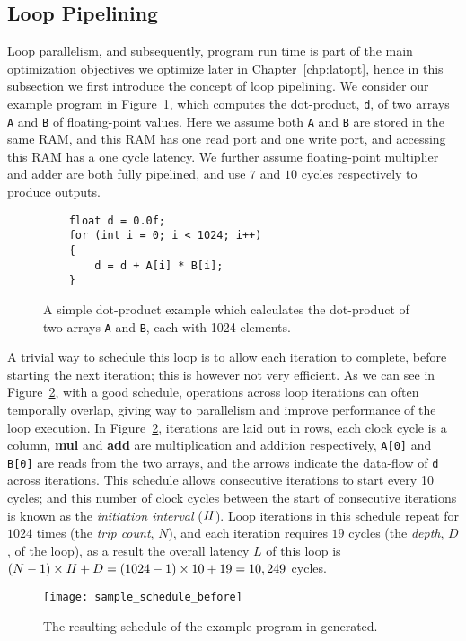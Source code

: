 \subsection{Loop Pipelining}
\label{bg:sub:loop_pipelining}

Loop parallelism, and subsequently, program run time is part of the main
optimization objectives we optimize later in Chapter~\ref{chp:latopt}, hence
in this subsection we first introduce the concept of loop pipelining.  We
consider our example program in Figure~\ref{bg:lst:dotprod}, which computes the
dot-product, \verb|d|, of two arrays \verb|A| and \verb|B| of floating-point
values.  Here we assume both \verb|A| and \verb|B| are stored in the same RAM,
and this RAM has one read port and one write port, and accessing this RAM has
a one cycle latency.  We further assume floating-point multiplier and adder
are both fully pipelined, and use $7$ and $10$ cycles respectively to produce
outputs.
\begin{figure}[ht]
    \centering
    \begin{minipage}{0.7\textwidth}
    \begin{lstlisting}
    float d = 0.0f;
    for (int i = 0; i < 1024; i++)
    {
        d = d + A[i] * B[i];
    }
    \end{lstlisting}
    \end{minipage}
    \caption{%
        A simple dot-product example which calculates the dot-product of two
        arrays \texttt{A} and \texttt{B}, each with 1024 elements.
    }\label{bg:lst:dotprod}
\end{figure}

A trivial way to schedule this loop is to allow each iteration to complete,
before starting the next iteration; this is however not very efficient.
As we can see in Figure~\ref{bg:fig:sample_schedule_before}, with a good
schedule, operations across loop iterations can often temporally overlap,
giving way to parallelism and improve performance of the loop execution.  In
Figure~\ref{bg:fig:sample_schedule_before}, iterations are laid out in rows,
each clock cycle is a column, \textbf{mul} and \textbf{add} are multiplication
and addition respectively, \verb|A[0]| and \verb|B[0]| are reads from the two
arrays, and the arrows indicate the data-flow of \verb|d| across iterations.
This schedule allows consecutive iterations to start every 10 cycles; and this
number of clock cycles between the start of consecutive iterations is known
as the \emph{initiation interval} ($\mathit{II}$).  Loop iterations in this schedule
repeat for $1024$ times (the \emph{trip count}, $N$), and each iteration
requires $19$ cycles (the \emph{depth}, $D$, of the loop), as a result the
overall latency $L$ of this loop is $(N - 1) \times \mathit{II} + D = (1024 - 1) \times
10 + 19 = 10,249$ cycles.
\begin{figure}[ht]
    \centering
    \texttt{[image: sample\_schedule\_before]}
    \caption{%
        The resulting schedule of the example program in generated.
    }\label{bg:fig:sample_schedule_before}
\end{figure}


